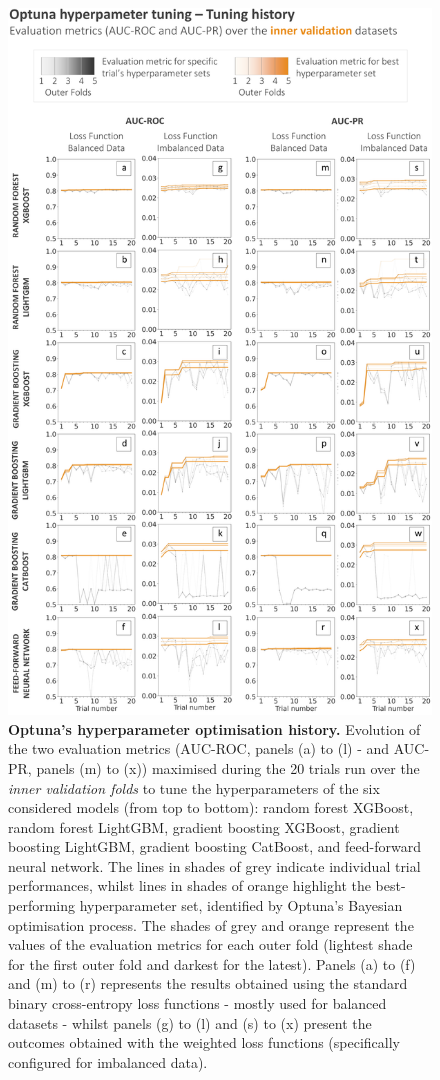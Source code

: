 \begin{figure}[htbp]
\centering
\includegraphics[scale=0.85]{optuna_history.png}
\caption{\textbf{Optuna's hyperparameter optimisation history.} Evolution of the two evaluation metrics (AUC-ROC, panels (a) to (l) - and AUC-PR, panels (m) to (x)) maximised during the 20 trials run over the \textcolor{colourInnerValidation}{\textit{inner validation folds}} to tune the hyperparameters of the six considered models (from top to bottom): random forest XGBoost, random forest LightGBM, gradient boosting XGBoost, gradient boosting LightGBM, gradient boosting CatBoost, and feed-forward neural network. The lines in shades of grey indicate individual trial performances, whilst lines in shades of orange highlight the best-performing hyperparameter set, identified by Optuna's Bayesian optimisation process. The shades of grey and orange represent the values of the evaluation metrics for each outer fold (lightest shade for the first outer fold and darkest for the latest). Panels (a) to (f) and (m) to (r) represents the results obtained using the standard binary cross-entropy loss functions - mostly used for balanced datasets - whilst panels (g) to (l) and (s) to (x) present the outcomes obtained with the weighted loss functions (specifically configured for imbalanced data).}

\end{figure}
